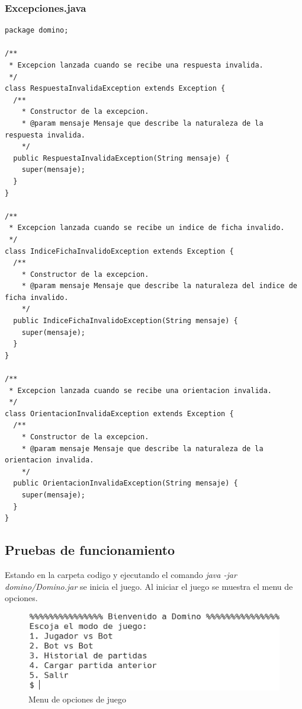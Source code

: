 \documentclass[12pt]{article}
\begin{document}
  \subsubsection{Excepciones.java}
  \begin{lstlisting}
package domino;

/**
 * Excepcion lanzada cuando se recibe una respuesta invalida.
 */
class RespuestaInvalidaException extends Exception {
  /**
    * Constructor de la excepcion.
    * @param mensaje Mensaje que describe la naturaleza de la respuesta invalida.
    */
  public RespuestaInvalidaException(String mensaje) {
    super(mensaje);
  }
}

/**
 * Excepcion lanzada cuando se recibe un indice de ficha invalido.
 */
class IndiceFichaInvalidoException extends Exception {
  /**
    * Constructor de la excepcion.
    * @param mensaje Mensaje que describe la naturaleza del indice de ficha invalido.
    */
  public IndiceFichaInvalidoException(String mensaje) {
    super(mensaje);
  }
}

/**
 * Excepcion lanzada cuando se recibe una orientacion invalida.
 */
class OrientacionInvalidaException extends Exception {
  /**
    * Constructor de la excepcion.
    * @param mensaje Mensaje que describe la naturaleza de la orientacion invalida.
    */
  public OrientacionInvalidaException(String mensaje) {
    super(mensaje);
  }
}
  \end{lstlisting}

  \subsection{Pruebas de funcionamiento}
  Estando en la carpeta codigo y ejecutando el comando \textit{java -jar domino/Domino.jar} se inicia el juego. Al iniciar el juego se muestra el menu de opciones.

  \begin{figure}[h!]
    \centering
    \includegraphics[]{pf1.png}
    \caption{Menu de opciones de juego}
  \end{figure}
\end{document}
